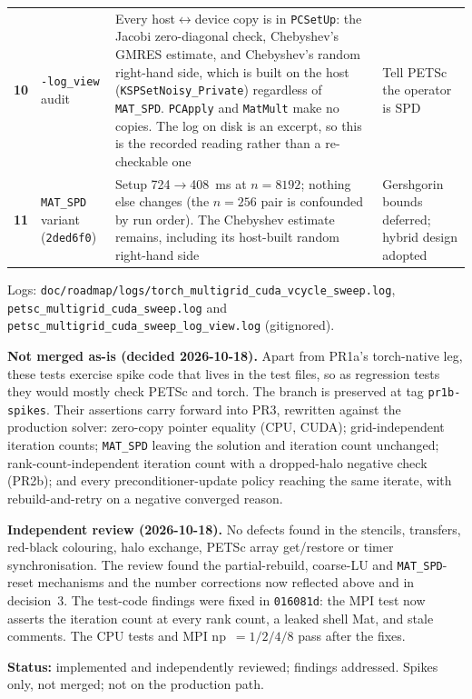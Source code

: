 \documentclass[11pt]{article}
\newcommand{\status}[1]{\textcolor{marlinteal}{\textbf{Status:}} #1}
\begin{document}
\begin{longtable}{>{\bfseries}p{} p{} p{} p{}}
10 & \texttt{-log\_view} audit & Every host$\leftrightarrow$device copy is in \texttt{PCSetUp}: the Jacobi zero-diagonal check, Chebyshev's GMRES estimate, and Chebyshev's random right-hand side, which is built on the host (\texttt{KSPSetNoisy\_Private}) regardless of \texttt{MAT\_SPD}. \texttt{PCApply} and \texttt{MatMult} make no copies. The log on disk is an excerpt, so this is the recorded reading rather than a re-checkable one & Tell PETSc the operator is SPD \\
11 & \texttt{MAT\_SPD} variant (\texttt{2ded6f0}) & Setup 724$\to$408~ms at $n=8192$; nothing else changes (the $n=256$ pair is confounded by run order). The Chebyshev estimate remains, including its host-built random right-hand side & Gershgorin bounds deferred; hybrid design adopted \\
\bottomrule
\end{longtable}

Logs: \texttt{doc/roadmap/logs/torch\_multigrid\_cuda\_vcycle\_sweep.log},
\texttt{petsc\_multigrid\_cuda\_sweep.log} and
\texttt{petsc\_multigrid\_cuda\_sweep\_log\_view.log} (gitignored).

\textbf{Not merged as-is (decided 2026-10-18).} Apart from PR1a's
torch-native leg, these tests exercise spike code that lives in the test
files, so as regression tests they would mostly check PETSc and torch. The
branch is preserved at tag \texttt{pr1b-spikes}. Their assertions carry
forward into PR3, rewritten against the production solver: zero-copy
pointer equality (CPU, CUDA); grid-independent iteration counts;
\texttt{MAT\_SPD} leaving the solution and iteration count unchanged;
rank-count-independent iteration count with a dropped-halo negative check
(PR2b); and every preconditioner-update policy reaching the same iterate,
with rebuild-and-retry on a negative converged reason.

\textbf{Independent review (2026-10-18).} No defects found in the stencils,
transfers, red-black colouring, halo exchange, PETSc array get/restore or
timer synchronisation. The review found the partial-rebuild, coarse-LU and
\texttt{MAT\_SPD}-reset mechanisms and the number corrections now reflected
above and in decision~3. The test-code findings were fixed in
\texttt{016081d}: the MPI test now asserts the iteration count at every
rank count, a leaked shell Mat, and stale comments. The CPU tests and MPI
np~$=1/2/4/8$ pass after the fixes.

\status{implemented and independently reviewed; findings addressed. Spikes
only, not merged; not on the production path.}
\end{document}
